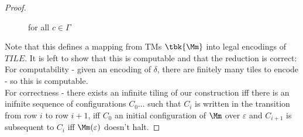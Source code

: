 \begin{proof}
\begin{itemize}
\begin{figure}[H]
	\caption{for all $c\in \Gamma$}
\end{figure}
\end{itemize}
Note that this defines a mapping from TMs $\tbk{\Mm}$ into legal encodings of $TILE$. It is left to show that this is computable and that the reduction is correct:\\
For computability - given an encoding of $\delta$, there are finitely many tiles to encode - so this is computable.\\
For correctness - there exists an infinite tiling of our construction iff there is an inifnite sequence of configurations $C_0\ldots$ such that $C_i$ is written in the transition from row $i$ to row $i+1$, iff $C_0$ an initial configuration of $\Mm$ over $\varepsilon$ and $C_{i+1}$ is subsequent to $C_i$ iff $\Mm(\varepsilon)$ doesn't halt.
\end{proof}
